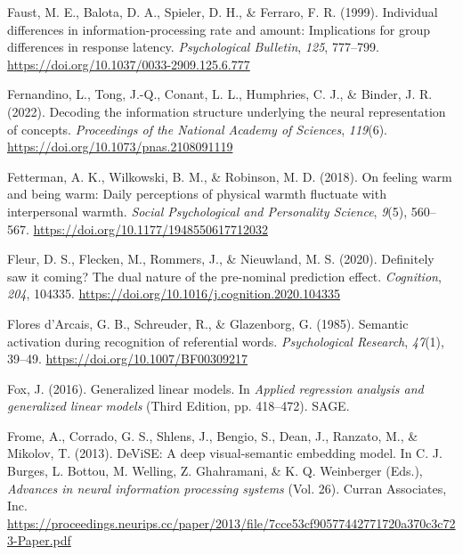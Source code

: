 \documentclass[
  12pt,
  man,floatsintext]{apa7}
\newlength{\cslhangindent}
\newlength{\cslentryspacingunit} %
\newenvironment{CSLReferences}[2] %
 {%
  \setlength{\parindent}{0pt}
  \ifodd #1
  \let\oldpar\par
  \def\par{\hangindent=\cslhangindent\oldpar}
  \fi
  \setlength{\parskip}{#2\cslentryspacingunit}
 }%
 {}
\begin{document}
\begin{CSLReferences}{1}{0}
\leavevmode{}%
Faust, M. E., Balota, D. A., Spieler, D. H., \& Ferraro, F. R. (1999). Individual differences in information-processing rate and amount: {Implications} for group differences in response latency. \emph{Psychological Bulletin}, \emph{125}, 777--799. \url{https://doi.org/10.1037/0033-2909.125.6.777}

\leavevmode{}%
Fernandino, L., Tong, J.-Q., Conant, L. L., Humphries, C. J., \& Binder, J. R. (2022). Decoding the information structure underlying the neural representation of concepts. \emph{Proceedings of the National Academy of Sciences}, \emph{119}(6). \url{https://doi.org/10.1073/pnas.2108091119}

\leavevmode{}%
Fetterman, A. K., Wilkowski, B. M., \& Robinson, M. D. (2018). On feeling warm and being warm: {Daily} perceptions of physical warmth fluctuate with interpersonal warmth. \emph{Social Psychological and Personality Science}, \emph{9}(5), 560--567. \url{https://doi.org/10.1177/1948550617712032}

\leavevmode{}%
Fleur, D. S., Flecken, M., Rommers, J., \& Nieuwland, M. S. (2020). Definitely saw it coming? {The} dual nature of the pre-nominal prediction effect. \emph{Cognition}, \emph{204}, 104335. \url{https://doi.org/10.1016/j.cognition.2020.104335}

\leavevmode{}%
Flores d'Arcais, G. B., Schreuder, R., \& Glazenborg, G. (1985). Semantic activation during recognition of referential words. \emph{Psychological Research}, \emph{47}(1), 39--49. \url{https://doi.org/10.1007/BF00309217}

\leavevmode{}%
Fox, J. (2016). Generalized linear models. In \emph{Applied regression analysis and generalized linear models} (Third Edition, pp. 418--472). {SAGE}.

\leavevmode{}%
Frome, A., Corrado, G. S., Shlens, J., Bengio, S., Dean, J., Ranzato, M., \& Mikolov, T. (2013). {DeViSE}: {A} deep visual-semantic embedding model. In C. J. Burges, L. Bottou, M. Welling, Z. Ghahramani, \& K. Q. Weinberger (Eds.), \emph{Advances in neural information processing systems} (Vol. 26). {Curran Associates, Inc.} \url{https://proceedings.neurips.cc/paper/2013/file/7cce53cf90577442771720a370c3c723-Paper.pdf}


\end{CSLReferences}
\end{document}
